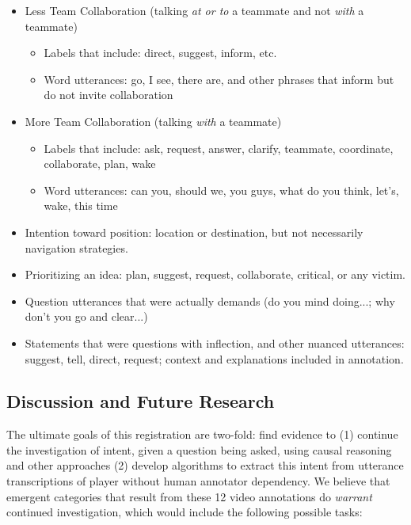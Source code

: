 \begin{itemize}
    \item Less Team Collaboration (talking \emph{at or to} a teammate and not \emph{with} a teammate)
    \begin{itemize}
    	\item Labels that include: direct, suggest, inform, etc.
	\item Word utterances: go, I see, there are, and other phrases that inform but do not invite collaboration
    \end{itemize}
    \item More Team Collaboration (talking \emph{with} a teammate)
    \begin{itemize}
        \item Labels that include: ask, request, answer, clarify, teammate, coordinate, collaborate, plan, wake
        \item Word utterances: can you, should we, you guys, what do you think, let's, wake, this time
    \end{itemize}
    \item Intention toward position: location or destination, but not necessarily navigation strategies.
    \item Prioritizing an idea: plan, suggest, request, collaborate, critical, or any victim.
    \item Question utterances that were actually demands (do you mind doing...; why don't you go and clear...)
    \item Statements that were questions with inflection, and other nuanced utterances: suggest, tell, direct, request; context and explanations included in annotation.
\end{itemize}


\subsection{Discussion and Future Research}

The ultimate goals of this registration are two-fold: find evidence to (1)
continue the investigation of intent, given a question being asked, using
causal reasoning and other approaches (2) develop algorithms to extract this
intent from utterance transcriptions of player without human annotator
dependency. We believe that emergent categories that result from these 12 video
annotations do \emph{warrant} continued investigation, which would include the
following possible tasks:

